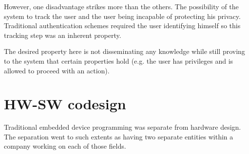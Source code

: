 However, one disadvantage strikes more than the others. The
possibility of the system to track the user and the user being
incapable of protecting his privacy. Traditional authentication
schemes required the user identifying himself so this tracking step
was an inherent property.

The desired property here is not disseminating any knowledge while
still proving to the system that certain properties hold (e.g. the
user has privileges and is allowed to proceed with an action).

\section{HW-SW codesign}

Traditional embedded device programming was separate from hardware
design. The separation went to such extents as having two separate
entities within a company working on each of those fields.

